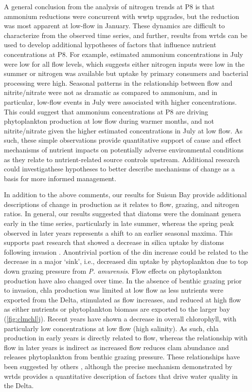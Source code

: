 \documentclass[letterpaper,12pt,oneside]{article}\usepackage[]{graphicx}\usepackage[]{color}
\begin{document}
A general conclusion from the analysis of nitrogen trends at P8 is that ammonium reductions were concurrent with \ac{wwtp} upgrades, but the reduction was most apparent at low-flow in January.  These dynamics are difficult to characterize from the observed time series, and further, results from \ac{wrtds} can be used to develop additional hypotheses of factors that influence nutrient concentrations at P8. For example, estimated ammonium concentrations in July were low for all flow levels, which suggests either nitrogen inputs were low in the summer or nitrogen was available but uptake by primary consumers and bacterial processing were high. Seasonal patterns in the relationship between flow and nitrite/nitrate were not as dramatic as compared to ammonium, and in particular, low-flow events in July were associated with higher concentrations.  This could suggest that ammonium concentrations at P8 are driving phytoplankton production at low flow during warmer months, and not nitrite/nitrate given the higher estimated concentrations in July at low flow. As such, these simple observations provide quantitative support of cause and effect mechanisms of nutrient impacts on potentially adverse environmental conditions as they relate to nutrient-related source controls upstream.  Additional research could investigathese hypotheses to better describe mechanisms of change as a basis for more informed management.

In addition to the above comments, our results for Suisun Bay provide additional descriptions of change in production as it relates to flow, grazing, and nitrogen ratios.  In general, our
results suggested that diatoms were the dominant genera early in the time series, particularly in late summer, whereas the spring peak observed in later years represents a shift to an earlier seasonal maxima.  This supports past research that showed a decrease in silica uptake by diatoms following invasion \citep{Cloern96,Kimmerer05}.  Anontrivial portion of the \ac{din} increase could be related to the decrease in a major `sink', i.e., decreased \ac{din} uptake by phytoplankton due to top down grazing pressure from \textit{P. amurensis}.  Flow effects on phytoplankton production have also changed over time. In the absence of benthic grazing prior to invasion, \ac{chla} production was limited at low flow as less nutrients were exported from the Delta, stimulated as flow increases, and reduced at high flow as either nutrients or phytoplankton biomass are exported to the larger bay (\cref{fig:clmchl}j). Recent years have shown a decrease in overall chlorophyll, with particularly low concentrations at low flow (high salinity).  As such, \ac{chla} production in early years is directly related to flow, whereas the relationship with flow in later years is indirect as increased flow reduces clam abundance and releases phytoplankton from benthic grazing pressure. These relationships have been suggested by others \citep{Cloern83,Alpine92,Parchaso02,Jassby08}, although the precise mechanism demonstrated by \ac{wrtds} provides a quantitative description of factors that drive water quality in the Delta.
 
\end{document}
